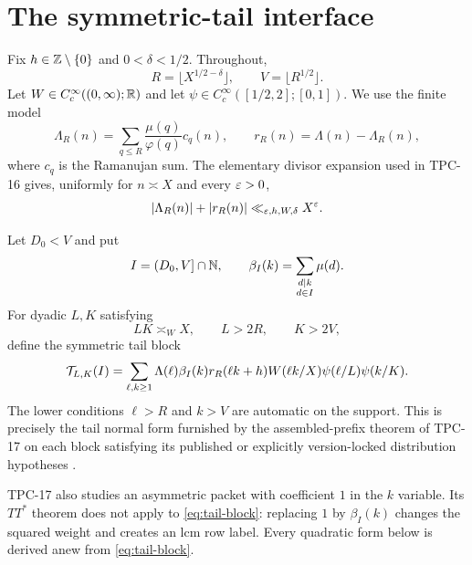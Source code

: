 \section{The symmetric-tail interface}
\label{sec:interface}

Fix $h\in\mathbb Z\setminus\{0\}$ and $0<\delta<1/2$.  Throughout,
\begin{equation}
 R=\lfloor X^{1/2-\delta}\rfloor,
 \qquad
 V=\lfloor R^{1/2}\rfloor.
 \label{eq:RV}
\end{equation}
Let $W\in C_c^\infty((0,\infty);\mathbb R)$ and let
$\psi\in C_c^\infty([1/2,2];[0,1])$.  We use the finite model
\begin{equation}
 \Lambda_R(n)=\sum_{q\le R}\frac{\mu(q)}{\varphi(q)}c_q(n),
 \qquad
 r_R(n)=\Lambda(n)-\Lambda_R(n),
 \label{eq:finite-model}
\end{equation}
where $c_q$ is the Ramanujan sum.  The elementary divisor expansion
used in TPC-16 \citep{WangTPC16} gives, uniformly for $n\asymp X$ and
every $\varepsilon>0$,
\begin{equation}
 |\Lambda_R(n)|+|r_R(n)|\ll_{\varepsilon,h,W,\delta}X^\varepsilon.
 \label{eq:soft-pointwise}
\end{equation}

Let $D_0<V$ and put
\begin{equation}
 I=(D_0,V]\cap\mathbb N,
 \qquad
 \beta_I(k)=\sum_{\substack{d\mid k\\d\in I}}\mu(d).
 \label{eq:beta-I}
\end{equation}
For dyadic $L,K$ satisfying
\begin{equation}
 LK\asymp_WX,\qquad L>2R,\qquad K>2V,
 \label{eq:block-geometry}
\end{equation}
define the symmetric tail block
\begin{equation}
 \mathcal T_{L,K}(I)
 =\sum_{\ell,k\ge1}
 \Lambda(\ell)\beta_I(k)r_R(\ell k+h)
 W(\ell k/X)\psi(\ell/L)\psi(k/K).
 \label{eq:tail-block}
\end{equation}
The lower conditions $\ell>R$ and $k>V$ are automatic on the support.
This is precisely the tail normal form furnished by the assembled-prefix
theorem of TPC-17 on each block satisfying its published or explicitly
version-locked distribution hypotheses \citep{WangTPC17}.

\begin{remark}
\label{rem:no-splice}
TPC-17 also studies an asymmetric packet with coefficient $1$ in the
$k$ variable.  Its $TT^*$ theorem does not apply to
\eqref{eq:tail-block}: replacing $1$ by $\beta_I(k)$ changes the squared
weight and creates an lcm row label.  Every quadratic form below is
derived anew from \eqref{eq:tail-block}.
\end{remark}

